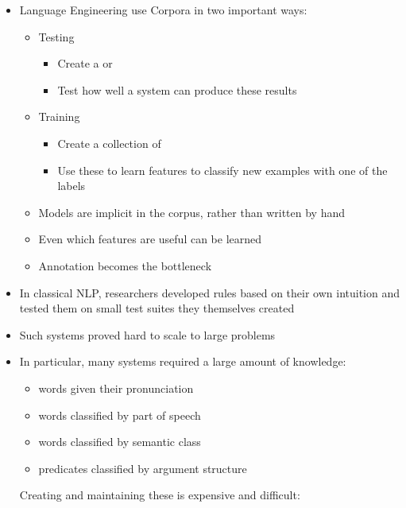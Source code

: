\documentclass[a4paper,landscape,headrule,footrule,xetex]{foils}
\begin{document}

\begin{itemize}
\item Language Engineering use Corpora in two important ways:
  \begin{itemize}
  \item Testing
    \begin{itemize}
    \item Create a  or 
    \item Test how well a system can produce these results
    \end{itemize}
  \item Training
   \begin{itemize}
    \item Create a collection of 
    \item Use these to learn features to classify new examples with
      one of the labels
    \end{itemize}

  \item Models are implicit in the corpus, rather than written by hand
  \item Even which features are useful can be learned
  \item Annotation becomes the bottleneck
  \end{itemize}
\end{itemize}


\begin{itemize}
\item In classical NLP, researchers developed rules based on their own
  intuition and tested them on small test suites they themselves created
\item Such systems proved hard to scale to large problems
\item In particular, many systems required a large amount of knowledge:
  \begin{itemize}
  \item words given their pronunciation
  \item words classified by part of speech
  \item words classified by semantic class
  \item predicates classified by argument structure
  \end{itemize}
Creating and maintaining these is expensive and difficult:
\\ 
\end{itemize}
\end{document}
